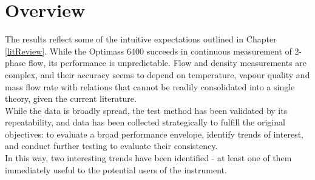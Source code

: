 \documentclass{report}
\begin{document}
\section{Overview}
The results reflect some of the intuitive expectations outlined in Chapter \ref{litReview}. While the Optimass 6400 succeeds in continuous measurement of 2-phase flow, its performance is unpredictable. Flow and density measurements are complex, and their accuracy seems to depend on temperature, vapour quality and mass flow rate with relations that cannot be readily consolidated into a single theory, given the current literature.\\
While the data is broadly spread, the test method has been validated by its repeatability, and data has been collected strategically to fulfill the original objectives: to evaluate a broad performance envelope, identify trends of interest, and conduct further testing to evaluate their consistency.\\
In this way, two interesting trends have been identified - at least one of them immediately useful to the potential users of the instrument. \\
\end{document}
